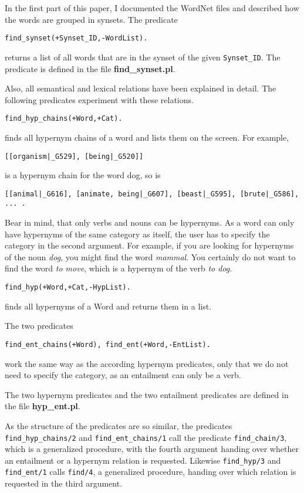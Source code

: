 \documentclass[12pt]{article}
\begin{document}
In the first part of this paper, I documented the WordNet files and described
how the words are grouped in synsets. The predicate
\begin{verbatim}
find_synset(+Synset_ID,-WordList).
\end{verbatim}
returns a list of all words that are in the synset of the given {\tt Synset\_ID}. The predicate is defined in the file
{\bfseries find\_synset.pl}.

Also, all semantical and lexical relations have been explained in detail. The following predicates experiment
with these relations.
 \begin{verbatim}
find_hyp_chains(+Word,+Cat).
\end{verbatim}
finds all hypernym chains of a word and lists them on the screen. For example,
\begin{verbatim}
[[organism|_G529], [being|_G520]]
\end{verbatim}
is a hypernym chain for the word dog, so is
\begin{verbatim}
[[animal|_G616], [animate, being|_G607], [beast|_G595], [brute|_G586], ... .
\end{verbatim}
Bear in mind, that only verbs and nouns can
be hypernyms. As a word can only have hypernyms of the same category as itself, the user has to specify the category in the second
argument. For example, if you are looking for hypernyms of the noun \emph{dog},
you might find the word \emph{mammal}. You certainly
do not want to find the word \emph{to move}, which is a hypernym of the verb \emph{to dog}.
\begin{verbatim}
find_hyp(+Word,+Cat,-HypList).
\end{verbatim}
finds all hypernyms of a Word and returns them in a list.

The two predicates
\begin{verbatim}
find_ent_chains(+Word), find_ent(+Word,-EntList).
\end{verbatim}
work the same way as the according hypernym predicates, only that we do not need to specify the category, as an entailment
can only be a verb.

The two hypernym predicates and the two entailment predicates are defined in the file {\bfseries hyp\_ent.pl}.

As the structure of the predicates are so similar, the predicates {\tt find\_hyp\_chains/2}
and {\tt find\_ent\_chains/1} call the predicate {\tt find\_chain/3},
which is a generalized procedure, with the fourth argument handing over whether an entailment or a hypernym relation is
requested. Likewise {\tt find\_hyp/3} and {\tt find\_ent/1} calls {\tt find/4}, a generalized procedure,
handing over which relation is requested in the
third argument.
\end{document}
